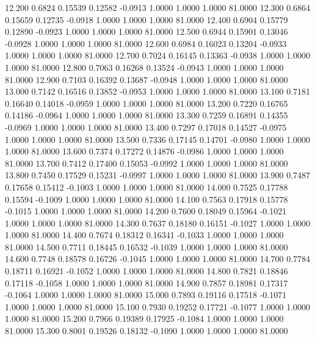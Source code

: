  12.200   0.6824   0.15539   0.12582  -0.0913   1.0000   1.0000   1.0000  81.0000
  12.300   0.6864   0.15659   0.12735  -0.0918   1.0000   1.0000   1.0000  81.0000
  12.400   0.6904   0.15779   0.12890  -0.0923   1.0000   1.0000   1.0000  81.0000
  12.500   0.6944   0.15901   0.13046  -0.0928   1.0000   1.0000   1.0000  81.0000
  12.600   0.6984   0.16023   0.13204  -0.0933   1.0000   1.0000   1.0000  81.0000
  12.700   0.7024   0.16145   0.13363  -0.0938   1.0000   1.0000   1.0000  81.0000
  12.800   0.7063   0.16268   0.13524  -0.0943   1.0000   1.0000   1.0000  81.0000
  12.900   0.7103   0.16392   0.13687  -0.0948   1.0000   1.0000   1.0000  81.0000
  13.000   0.7142   0.16516   0.13852  -0.0953   1.0000   1.0000   1.0000  81.0000
  13.100   0.7181   0.16640   0.14018  -0.0959   1.0000   1.0000   1.0000  81.0000
  13.200   0.7220   0.16765   0.14186  -0.0964   1.0000   1.0000   1.0000  81.0000
  13.300   0.7259   0.16891   0.14355  -0.0969   1.0000   1.0000   1.0000  81.0000
  13.400   0.7297   0.17018   0.14527  -0.0975   1.0000   1.0000   1.0000  81.0000
  13.500   0.7336   0.17145   0.14701  -0.0980   1.0000   1.0000   1.0000  81.0000
  13.600   0.7374   0.17272   0.14876  -0.0986   1.0000   1.0000   1.0000  81.0000
  13.700   0.7412   0.17400   0.15053  -0.0992   1.0000   1.0000   1.0000  81.0000
  13.800   0.7450   0.17529   0.15231  -0.0997   1.0000   1.0000   1.0000  81.0000
  13.900   0.7487   0.17658   0.15412  -0.1003   1.0000   1.0000   1.0000  81.0000
  14.000   0.7525   0.17788   0.15594  -0.1009   1.0000   1.0000   1.0000  81.0000
  14.100   0.7563   0.17918   0.15778  -0.1015   1.0000   1.0000   1.0000  81.0000
  14.200   0.7600   0.18049   0.15964  -0.1021   1.0000   1.0000   1.0000  81.0000
  14.300   0.7637   0.18180   0.16151  -0.1027   1.0000   1.0000   1.0000  81.0000
  14.400   0.7674   0.18312   0.16341  -0.1033   1.0000   1.0000   1.0000  81.0000
  14.500   0.7711   0.18445   0.16532  -0.1039   1.0000   1.0000   1.0000  81.0000
  14.600   0.7748   0.18578   0.16726  -0.1045   1.0000   1.0000   1.0000  81.0000
  14.700   0.7784   0.18711   0.16921  -0.1052   1.0000   1.0000   1.0000  81.0000
  14.800   0.7821   0.18846   0.17118  -0.1058   1.0000   1.0000   1.0000  81.0000
  14.900   0.7857   0.18981   0.17317  -0.1064   1.0000   1.0000   1.0000  81.0000
  15.000   0.7893   0.19116   0.17518  -0.1071   1.0000   1.0000   1.0000  81.0000
  15.100   0.7930   0.19252   0.17721  -0.1077   1.0000   1.0000   1.0000  81.0000
  15.200   0.7966   0.19389   0.17925  -0.1084   1.0000   1.0000   1.0000  81.0000
  15.300   0.8001   0.19526   0.18132  -0.1090   1.0000   1.0000   1.0000  81.0000
